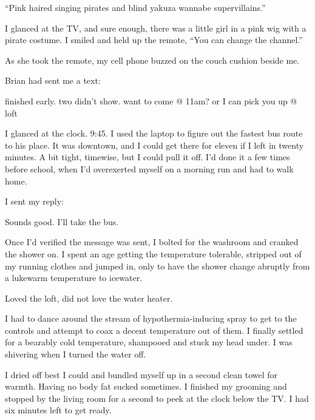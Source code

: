 ``Pink haired singing pirates and blind yakuza wannabe supervillains.''



I glanced at the TV, and sure enough, there was a little girl in a pink wig with a pirate costume.  I smiled and held up the remote, ``You can change the channel.''



As she took the remote, my cell phone buzzed on the couch cushion beside me.



Brian had sent me a text:



finished early.  two didn't show.  want to come @ 11am?  or I can pick you up @ loft



I glanced at the clock.  9:45.  I used the laptop to figure out the fastest bus route to his place.  It was downtown, and I could get there for eleven if I left in twenty minutes.  A bit tight, timewise, but I could pull it off.  I'd done it a few times before school, when I'd overexerted myself on a morning run and had to walk home.



I sent my reply:



Sounds good.  I'll take the bus.



Once I'd verified the message was sent, I bolted for the washroom and cranked the shower on.  I spent an age getting the temperature tolerable, stripped out of my running clothes and jumped in, only to have the shower change abruptly from a lukewarm temperature to icewater.



Loved the loft, did not love the water heater.



I had to dance around the stream of hypothermia-inducing spray to get to the controls and attempt to coax a decent temperature out of them.  I finally settled for a bearably cold temperature, shampooed and stuck my head under.  I was shivering when I turned the water off.



I dried off best I could and bundled myself up in a second clean towel for warmth.  Having no body fat sucked sometimes.  I finished my grooming and stopped by the living room for a second to peek at the clock below the TV.  I had six minutes left to get ready.



